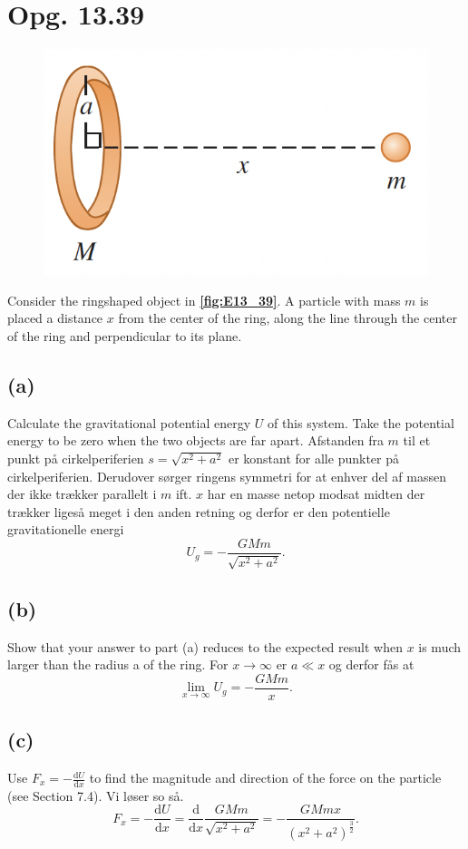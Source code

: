 \documentclass[12pt]{article}
\theoremstyle{definition}
\begin{document}
\section*{Opg. 13.39}
\begin{figure} [ht]
  \centering
  \caption{}
  \includegraphics[width=0.6\linewidth]{../figures/E13_39.png}
  \label{fig:E13_39}
\end{figure}

Consider the ringshaped object in \textbf{\autoref{fig:E13_39}}. A particle with mass $m$ is placed a distance $x$ from the center of the ring, along the line through the center of the ring and perpendicular to its plane.

\subsection*{(a)}
Calculate the gravitational potential energy $U$ of this system. Take the potential energy to be zero when the two objects are far apart.
\bigbreak
Afstanden fra $m$ til et punkt på cirkelperiferien $s = \sqrt{x^2 + a^2}$ er konstant for alle punkter på cirkelperiferien. Derudover sørger ringens symmetri for at enhver del af massen der ikke trækker parallelt i $m$ ift. $x$ har en masse netop modsat midten der trækker ligeså meget i den anden retning og derfor er den potentielle gravitationelle energi
\[ 
U_g = - \frac{GMm}{\sqrt{x^2 + a^2}}
.\]

\subsection*{(b)}
Show that your answer to part (a) reduces to the expected result when $x$ is much larger than the radius a of the ring.
\bigbreak
For $x \to \infty$ er $a \ll x$ og derfor fås at
\[ 
\lim_{x \to \infty } U_g = -\frac{GMm}{x}
.\]



\subsection*{(c)}
Use $F_x = - \frac{\mathrm{d}U}{\mathrm{d}x}$ to find the magnitude and direction of the force on the particle (see Section 7.4).
\bigbreak
Vi løser so så.
\[ 
F_x = - \frac{\mathrm{d}U}{\mathrm{d}x} = \frac{\mathrm{d}}{\mathrm{d}x} \frac{GMm}{\sqrt{x^2 + a^2}} = - \frac{GMmx}{\left( x^2 + a^2 \right)^{\frac{3}{2}}}
.\]
\end{document}
